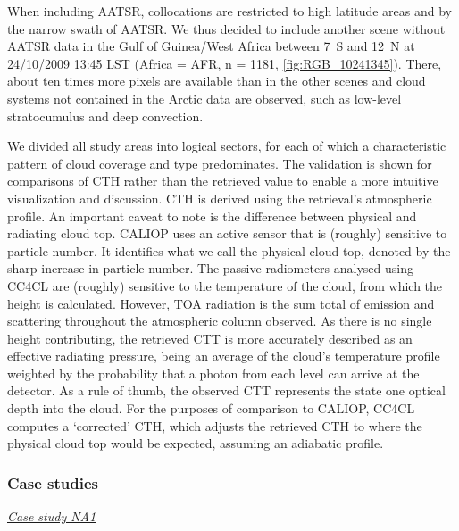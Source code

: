 When including AATSR, collocations are restricted to high latitude areas and by the narrow swath of AATSR. We thus decided to include another scene without AATSR data in the Gulf of Guinea/West Africa between 7\textdegree\ S and 12\textdegree\ N at 24/10/2009 13:45 LST (Africa = AFR, n = 1181, \cref{fig:RGB_10241345}). There, about ten times more pixels are available than in the other scenes and cloud systems not contained in the Arctic data are observed, such as low-level stratocumulus and deep convection.

We divided all study areas into logical sectors, for each of which a characteristic pattern of cloud coverage and type predominates. The validation is shown for comparisons of CTH rather than the retrieved value to enable a more intuitive visualization and discussion. CTH is derived using the retrieval's atmospheric profile. An important caveat to note is the difference between physical and radiating cloud top. CALIOP uses an active sensor that is (roughly) sensitive to particle number. It identifies what we call the physical cloud top, denoted by the sharp increase in particle number. The passive radiometers analysed using CC4CL are (roughly) sensitive to the temperature of the cloud, from which the height is calculated. However, TOA radiation is the sum total of emission and scattering throughout the atmospheric column observed. As there is no single height contributing, the retrieved CTT is more accurately described as an effective radiating pressure, being an average of the cloud’s temperature profile weighted by the probability that a photon from each level can arrive at the detector. As a rule of thumb, the observed CTT represents the state one optical depth into the cloud. For the purposes of comparison to CALIOP, CC4CL computes a `corrected’ CTH, which adjusts the retrieved CTH to where the physical cloud top would be expected, assuming an adiabatic profile.

\subsubsection{Case studies}

\vspace{5mm}\underline{\textit{Case study NA1}}\vspace{2mm}

